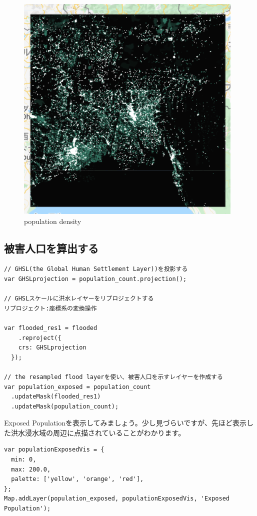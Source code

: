 \documentclass[
]{book}
\begin{document}
\begin{figure}
\centering
\includegraphics{images/population.png}
\caption{population density}
\end{figure}

\hypertarget{ux88abux5bb3ux4ebaux53e3ux3092ux7b97ux51faux3059ux308b}{%
\subsection{被害人口を算出する}\label{ux88abux5bb3ux4ebaux53e3ux3092ux7b97ux51faux3059ux308b}}

\begin{verbatim}
// GHSL(the Global Human Settlement Layer))を投影する
var GHSLprojection = population_count.projection();

// GHSLスケールに洪水レイヤーをリプロジェクトする
リプロジェクト:座標系の変換操作

var flooded_res1 = flooded
    .reproject({
    crs: GHSLprojection
  });

// the resampled flood layerを使い、被害人口を示すレイヤーを作成する
var population_exposed = population_count
  .updateMask(flooded_res1)
  .updateMask(population_count);
\end{verbatim}

Exposed Populationを表示してみましょう。少し見づらいですが、先ほど表示した洪水浸水域の周辺に点描されていることがわかります。

\begin{verbatim}
var populationExposedVis = {
  min: 0,
  max: 200.0,
  palette: ['yellow', 'orange', 'red'],
};
Map.addLayer(population_exposed, populationExposedVis, 'Exposed Population');
\end{verbatim}
\end{document}
